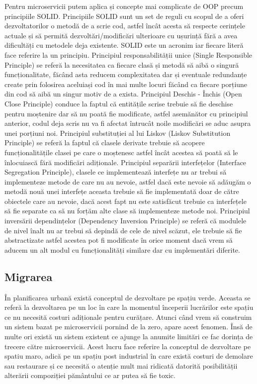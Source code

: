 Pentru microservicii putem aplica și concepte mai complicate de OOP precum principiile SOLID.
Principiile SOLID sunt un set de reguli cu scopul de a oferi dezvoltatorilor o metodă de a
scrie cod, astfel încât acesta să respecte cerințele actuale și să permită dezvoltări/modificări
ulterioare cu ușurință fără a avea dificultăți cu metodele deja existente. SOLID este un acronim
iar fiecare literă face referire la un principiu. Principiul responsabilității unice (Single Responsible
Principle) se referă la necesitatea ca fiecare clasă și metodă să aibă o singură funcționalitate,
făcând asta reducem complexitatea dar și eventuale redundanțe create prin folosirea aceluiași
cod în mai multe locuri făcând ca fiecare porțiune din cod să aibă un singur motiv de a exista.
Principiul Deschis - Închis (Open Close Principle) conduce la faptul că entitățile scrise trebuie să
fie deschise pentru moștenire dar să nu poată fie modificate, astfel asemănător cu principiul
anterior, codul deja scris nu va fi afectat întrucât noile modificări se aduc asupra unei porțiuni
noi. Principiul substituției al lui Liskov (Liskov Substitution Principle) se referă la faptul că clasele
derivate trebuie să acopere funcționalitățile clasei pe care o moștenesc astfel încât acestea să
poată să le înlocuiască fără modificări adiționale. Principiul separării interfețelor (Interface
Segregation Principle), clasele ce implementează interfețe nu ar trebui să implementeze metode
de care nu au nevoie, astfel dacă este nevoie să adăugăm o metodă nouă unei interfețe aceasta
trebuie să fie implementată doar de către obiectele care au nevoie, dacă acest fapt nu este
satisfăcut trebuie ca interfețele să fie separate ca să nu forțăm alte clase să implementeze
metode noi. Principiul inversării dependințelor (Dependency Inversion Principle) se referă că
modulele de nivel înalt nu ar trebui să depindă de cele de nivel scăzut, ele trebuie să fie
abstractizate astfel acestea pot fi modificate în orice moment dacă vrem să aducem un alt modul
cu funcționalități similare dar cu implementări diferite.

\subsection{Migrarea}

În planificarea urbană există conceptul de dezvoltare pe spațiu verde. Aceasta se referă 
la dezvoltarea pe un loc în care la momentul începerii lucrărilor este spațiu ce nu necesită
costuri adiționale pentru curățare. Atunci când vrem să construim un sistem bazat pe microservicii
pornind de la zero, apare acest fenomen. Însă de multe ori există un sistem existent ce ajunge
la anumite limitări ce fac dorința de trecere către microservicii. Acest lucru face referire la 
conceptul de dezvoltare pe spatiu maro, adică pe un spațiu post industrial în care există costuri de 
demolare sau restaurare și ce necesită o atenție mult mai ridicată datorită posibilității alterării
compoziției pământului ce ar putea să fie toxic.

